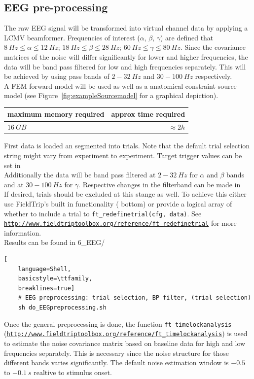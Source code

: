 \documentclass[12pt,a4paper]{scrartcl}
\begin{document}
\subsection{EEG pre-processing}
The raw EEG signal will be transformed into virtual channel data by applying a LCMV beamformer. Frequencies of interest ($\alpha$, $\beta$, $\gamma$) are defined that $8~Hz \leq \alpha \leq 12~Hz$; $18~Hz \leq \beta \leq 28~Hz$; $60~Hz \leq \gamma \leq 80~Hz$. Since the covariance matrices of the noise will differ significantly for lower and higher frequencies, the data will be band pass filtered for low and high frequencies separately. This will be achieved by using pass bands of $2-32~Hz$ and $30-100~Hz$ respectively.\\
A FEM forward model will be used as well as a anatomical constraint source model (see Figure~\ref{fig:exampleSourcemodel} for a graphical depiction).\\
\begin{table}[h]
\begin{tabular}{l | r}
\toprule
maximum memory required & approx time required\\\toprule
$16~GB$ & $\approx 2h$ \\\bottomrule
\end{tabular}
\end{table}
First data is loaded an segmented into trials. Note that the default trial selection string might vary from experiment to experiment. Target trigger values can be set in \texttt{}\\
Additionally the data will be band pass filtered at $2-32~Hz$ for $\alpha$ and $\beta$ bands and at $30-100~Hz$ for $\gamma$. Respective changes in the filterband can be made in \texttt{}\\
If desired, trials should be excluded at this stange as well. To achieve this either use FieldTrip's built in functionality (\texttt{} bottom) or provide a logical array of whether to include a trial to \texttt{ft\_redefinetrial(cfg, data)}. See \href{http://www.fieldtriptoolbox.org/reference/ft_redefinetrial}{\nolinkurl{http://www.fieldtriptoolbox.org/reference/ft\_redefinetrial}} for more information.\\

\noindent Results can be found in 6\_EEG/\\
\begin{lstlisting}[
    language=Shell,
    basicstyle=\ttfamily,
    breaklines=true]
    # EEG preprocessing: trial selection, BP filter, (trial selection)
    sh do_EEGpreprocessing.sh
\end{lstlisting}
Once the general preprocessing is done, the function \texttt{ft\_timelockanalysis} (\href{http://www.fieldtriptoolbox.org/reference/ft\_timelockanalysis}{\nolinkurl{http://www.fieldtriptoolbox.org/reference/ft\_timelockanalysis}}) is used to estimate the noise covariance matrix based on baseline data for high and low frequencies separately. This is necessary since the noise structure for those different bands varies significantly. The default noise estimation window is $-0.5$ to $-0.1~s$ realtive to stimulus onset.\\
\end{document}

